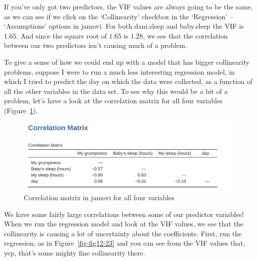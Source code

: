 \documentclass[
  a4paper,
]{book}
\begin{document}
If you've only got two predictors, the VIF values are always going to be
the same, as we can see if we click on the `Collinearity' checkbox in
the `Regression' -- `Assumptions' options in jamovi. For both dani.sleep
and baby.sleep the VIF is \(1.65\). And since the square root of
\(1.65\) is \(1.28\), we see that the correlation between our two
predictors isn't causing much of a problem.

To give a sense of how we could end up with a model that has bigger
collinearity problems, suppose I were to run a much less interesting
regression model, in which I tried to predict the day on which the data
were collected, as a function of all the other variables in the data
set. To see why this would be a bit of a problem, let's have a look at
the correlation matrix for all four variables
(Figure~\ref{fig-fig12-22}).

\begin{figure}[h!]

\includegraphics[width=1\textwidth,height=\textheight]{images/fig12-22.png} \hfill{}

\caption{\label{fig-fig12-22}Correlation matrix in jamovi for all four
variables}

\end{figure}

We have some fairly large correlations between some of our predictor
variables! When we run the regression model and look at the VIF values,
we see that the collinearity is causing a lot of uncertainty about the
coefficients. First, run the regression, as in Figure~\ref{fig-fig12-23}
and you can see from the VIF values that, yep, that's some mighty fine
collinearity there.
\end{document}
